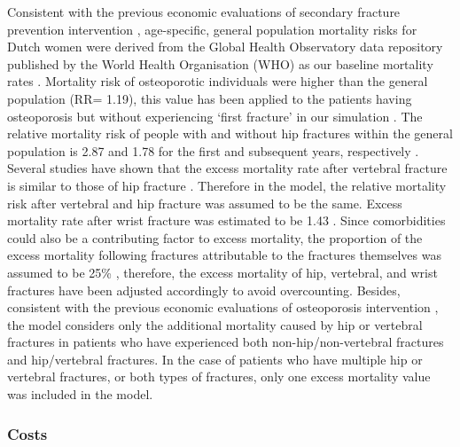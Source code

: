 Consistent with the previous economic evaluations of  secondary fracture prevention intervention \cite{4-52}, age-specific, general population mortality risks for Dutch women were derived from the Global Health Observatory data repository published by the World Health Organisation (WHO) as our baseline mortality rates \cite{4-53}. Mortality risk of osteoporotic individuals were higher than the general population (RR= 1.19), this value has been applied to the patients having osteoporosis but without experiencing `first fracture' in our simulation \cite{4-54}. The relative mortality risk of people with and without hip fractures within the general population is 2.87 and 1.78 for the first and subsequent years, respectively \cite{4-55}. Several studies have shown that the excess mortality rate after vertebral fracture is similar to those of hip fracture \cite{4-56,4-57,4-58}. Therefore in the model, the relative mortality risk after vertebral and hip fracture was assumed to be the same. Excess mortality rate after wrist fracture was estimated to be 1.43 \cite{4-59}. Since comorbidities could also be a contributing factor to excess mortality, the proportion of the excess mortality following fractures attributable to the fractures themselves was assumed to be 25\% \cite{4-60,4-61}, therefore, the excess mortality of hip, vertebral, and wrist fractures have been adjusted accordingly to avoid overcounting. Besides, consistent with the previous economic evaluations of osteoporosis intervention \cite{4-62}, the model considers only the additional mortality caused by hip or vertebral fractures in patients who have experienced both non-hip/non-vertebral fractures and hip/vertebral fractures. In the case of patients who have multiple hip or vertebral fractures, or both types of fractures, only one excess mortality value was included in the model.

\subsubsection{Costs}

